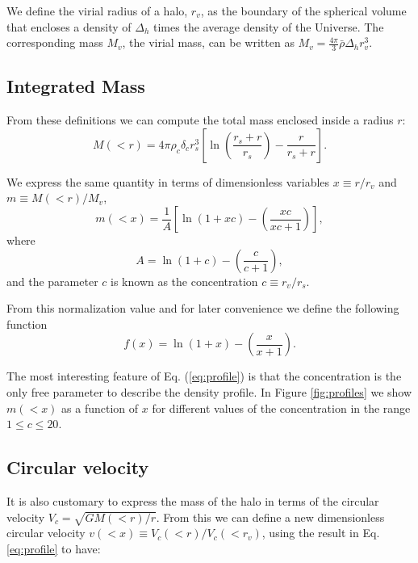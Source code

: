 \documentclass{emulateapj}
\begin{document}
We define the virial radius of a halo, $r_v$, as the boundary of the
spherical volume that encloses a density of $\Delta_h$ times
the average density of the Universe. 
The corresponding mass $M_{v}$, the virial mass, can be written as
$M_{v} = \frac{4\pi}{3}\bar{\rho}\Delta_h r_v^3$.


\subsection{Integrated Mass}
From these definitions we can compute the total mass enclosed inside a
radius $r$:
\begin{equation}
M(<r) = 4\pi\rho_c\delta_c  r_s^3\left[\ln \left
  (\frac{r_s+r}{r_s}\right) - \frac{r}{r_s+r}\right].
\end{equation}

We express the same quantity in terms of dimensionless
variables $x\equiv r/r_v$ and $m\equiv M(<r)/M_v$,
%
\begin{equation}
m(<x) =
\frac{1}{A}\left[\ln\left(1+xc\right)-\left(\frac{xc}{xc+1}\right)\right],
\label{eq:profile}
\end{equation}
%
where
%
\begin{equation}
A=\ln\left(1+c\right)-\left(\frac{c}{c+1}\right),
\end{equation}
%
and the parameter $c$ is known as the concentration $c\equiv r_v/r_s$.

From this normalization value and for later convenience we define the
following function
%
\begin{equation}
f(x) = \ln\left(1+x\right)-\left(\frac{x}{x+1}\right).
\label{eq:f_NFW}
\end{equation}
%

The most interesting feature of Eq. (\ref{eq:profile}) is that the
concentration is the only free parameter to describe the density
profile. In Figure \ref{fig:profiles} we show $m(<x)$ as
a function of $x$ for different values of the concentration in the range
$1\leq c \leq 20$.


\subsection{Circular velocity}

It is also customary to express the mass of the halo in terms of the
circular velocity $V_{c}=\sqrt{GM(<r)/r}$. From this we can
define a new dimensionless circular velocity $v(<x)\equiv
V_{c}(<r)/V_{c}(<r_v)$, using the result in Eq. \ref{eq:profile}
to have:
\end{document}
